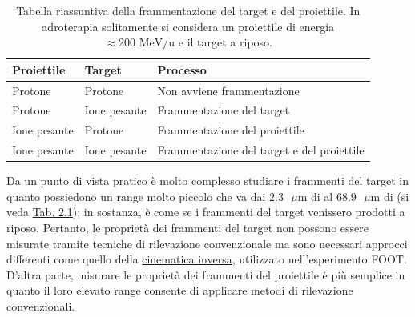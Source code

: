 \documentclass[12pt,a4paper,twoside]{report}
\begin{document}
	\begin{table}[H]
		\begin{minipage}{\textwidth}
			\centering
			\begin{tabular}{ |M{2.87cm}|M{2.87cm}||m{7.7cm}| }
				\hline
				Proiettile & Target & Processo\\
				\hline\hline
				Protone & Protone & Non avviene frammentazione\\
				\hline
				Protone & Ione pesante & Frammentazione del target\\
				\hline
				Ione pesante & Protone & Frammentazione del proiettile\\
				\hline
				Ione pesante & Ione pesante & Frammentazione del target e del proiettile\\
				\hline
			\end{tabular}
		\end{minipage}
		\caption{Tabella riassuntiva della frammentazione del target e del proiettile. In adroterapia solitamente si considera un proiettile di energia $\approx200\mbox{ MeV/u}$ e il target a riposo.}
		\label{tab:fragmentation}
	\end{table}
	Da un punto di vista pratico è molto complesso studiare i frammenti del target in quanto possiedono un range molto piccolo che va dai $2.3\mbox{ }\mu\mbox{m}$ di  al $68.9\mbox{ }\mu\mbox{m}$ di  (si veda \hyperref[tab:range]{Tab. 2.1}); in sostanza, è come se i frammenti del target venissero prodotti a riposo. Pertanto, le proprietà dei frammenti del target non possono essere misurate tramite tecniche di rilevazione convenzionale ma sono necessari approcci differenti come quello della \hyperref[sec:cinematica_inversa]{cinematica inversa}, utilizzato nell'esperimento FOOT. D'altra parte, misurare le proprietà dei frammenti del proiettile è più semplice in quanto il loro elevato range consente di applicare metodi di rilevazione convenzionali.
	 
\end{document}
